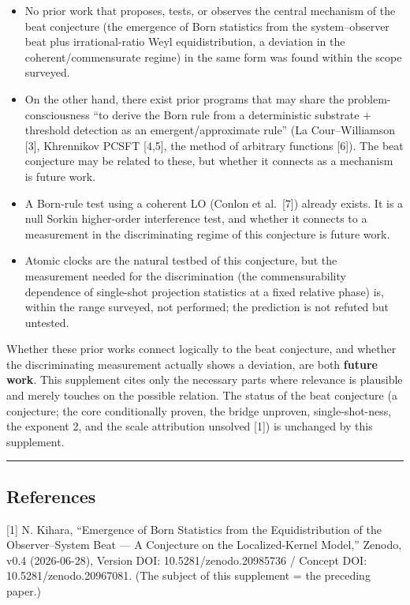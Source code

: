 \documentclass[
]{ltjsarticle}
\providecommand{\tightlist}{%
  \setlength{\itemsep}{0pt}\setlength{\parskip}{0pt}}
\begin{document}
\begin{itemize}
\tightlist
\item
  No prior work that proposes, tests, or observes the central mechanism
  of the beat conjecture (the emergence of Born statistics from the
  system--observer beat plus irrational-ratio Weyl equidistribution, a
  deviation in the coherent/commensurate regime) in the same form was
  found within the scope surveyed.
\item
  On the other hand, there exist prior programs that may share the
  problem-consciousness ``to derive the Born rule from a deterministic
  substrate + threshold detection as an emergent/approximate rule'' (La
  Cour--Williamson {[}3{]}, Khrennikov PCSFT {[}4,5{]}, the method of
  arbitrary functions {[}6{]}). The beat conjecture may be related to
  these, but whether it connects as a mechanism is future work.
\item
  A Born-rule test using a coherent LO (Conlon et al.~{[}7{]}) already
  exists. It is a null Sorkin higher-order interference test, and
  whether it connects to a measurement in the discriminating regime of
  this conjecture is future work.
\item
  Atomic clocks are the natural testbed of this conjecture, but the
  measurement needed for the discrimination (the commensurability
  dependence of single-shot projection statistics at a fixed relative
  phase) is, within the range surveyed, not performed; the prediction is
  not refuted but untested.
\end{itemize}

Whether these prior works connect logically to the beat conjecture, and
whether the discriminating measurement actually shows a deviation, are
both \textbf{future work}. This supplement cites only the necessary
parts where relevance is plausible and merely touches on the possible
relation. The status of the beat conjecture (a conjecture; the core
conditionally proven, the bridge unproven, single-shot-ness, the
exponent 2, and the scale attribution unsolved {[}1{]}) is unchanged by
this supplement.

\begin{center}\rule{0.5\linewidth}{0.5pt}\end{center}

\subsection{References}\label{references}

{[}1{]} N. Kihara, ``Emergence of Born Statistics from the
Equidistribution of the Observer--System Beat --- A Conjecture on the
Localized-Kernel Model,'' Zenodo, v0.4 (2026-06-28), Version DOI:
10.5281/zenodo.20985736 / Concept DOI: 10.5281/zenodo.20967081. (The
subject of this supplement = the preceding paper.)
\end{document}
